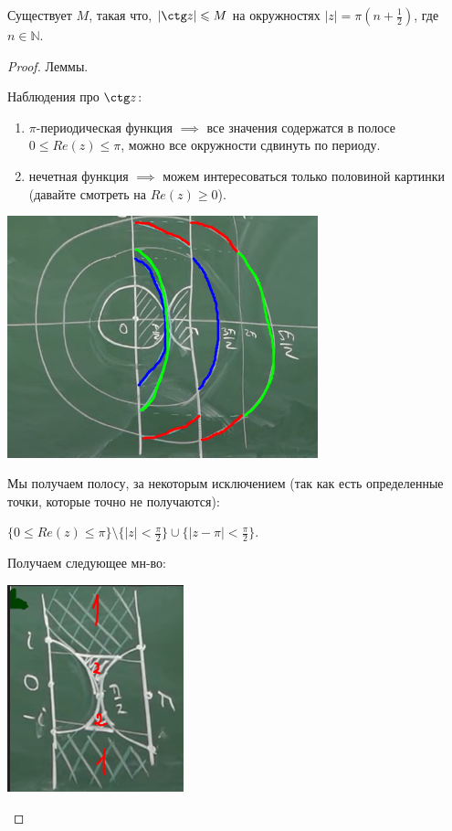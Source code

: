 \begin{lemma}
    Существует $M$, такая что, $|\ctg z| \leqslant M$ на окружностях $|z| = \pi (n + \frac{1}{2})$, где $n \in \mathbb{N}$.
\end{lemma}
\begin{proof}
    Леммы.

    Наблюдения про $\ctg z$:
    \begin{enumerate}
        \item $\pi$-периодическая функция $\implies$ все значения содержатся в полосе $0 \leq Re(z) \leq \pi$, можно все окружности сдвинуть по периоду.
        \item нечетная функция $\implies$ можем интересоваться только половиной картинки (давайте смотреть на $Re(z) \geq 0$).
    \end{enumerate}

    \begin{center}
        \includegraphics[width=9cm]{assets/04-functions-of-complex-variables/ctg-lemma.png}
    \end{center}

    Мы получаем полосу, за некоторым исключением (так как есть определенные точки, которые точно не получаются):

    $\{ 0 \leq Re(z) \leq \pi \} \setminus \{ |z| < \frac{\pi}{2} \} \cup \{ |z - \pi| < \frac{\pi}{2} \}$.

    Получаем следующее мн-во:

    \begin{center}
        \includegraphics[height=6cm]{assets/04-functions-of-complex-variables/ctg-lemma-2.png}
    \end{center}


\end{proof}
